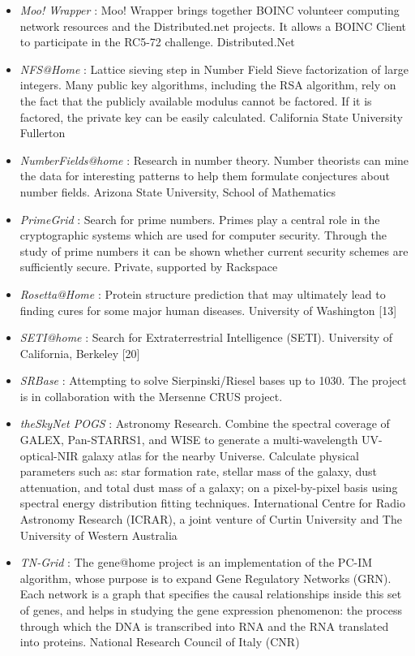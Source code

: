 \begin{itemize}
	\item {\em Moo! Wrapper} : Moo! Wrapper brings together BOINC volunteer computing network resources and the Distributed.net projects. It allows a BOINC Client to participate in the RC5-72 challenge.	Distributed.Net	
	\item {\em NFS@Home} : Lattice sieving step in Number Field Sieve factorization of large integers. Many public key algorithms, including the RSA algorithm, rely on the fact that the publicly available modulus cannot be factored. If it is factored, the private key can be easily calculated.	California State University Fullerton	
	\item {\em NumberFields@home} : Research in number theory. Number theorists can mine the data for interesting patterns to help them formulate conjectures about number fields.	Arizona State University, School of Mathematics	
	\item {\em PrimeGrid} : Search for prime numbers. Primes play a central role in the cryptographic systems which are used for computer security. Through the study of prime numbers it can be shown whether current security schemes are sufficiently secure.	Private, supported by Rackspace
	\item {\em Rosetta@Home} : Protein structure prediction that may ultimately lead to finding cures for some major human diseases. University of Washington [13]
	\item {\em SETI@home} : Search for Extraterrestrial Intelligence (SETI). University of California, Berkeley [20]
	\item {\em SRBase} : Attempting to solve Sierpinski/Riesel bases up to 1030.	The project is in collaboration with the Mersenne CRUS project.	
	\item {\em theSkyNet POGS} : Astronomy Research. Combine the spectral coverage of GALEX, Pan-STARRS1, and WISE to generate a multi-wavelength UV-optical-NIR galaxy atlas for the nearby Universe. Calculate physical parameters such as: star formation rate, stellar mass of the galaxy, dust attenuation, and total dust mass of a galaxy; on a pixel-by-pixel basis using spectral energy distribution fitting techniques.	International Centre for Radio Astronomy Research (ICRAR), a joint venture of Curtin University and The University of Western Australia	
	\item {\em TN-Grid} : The gene@home project is an implementation of the PC-IM algorithm, whose purpose is to expand Gene Regulatory Networks (GRN). Each network is a graph that specifies the causal relationships inside this set of genes, and helps in studying the gene expression phenomenon: the process through which the DNA is transcribed into RNA and the RNA translated into proteins.	National Research Council of Italy (CNR)

\end{itemize}
